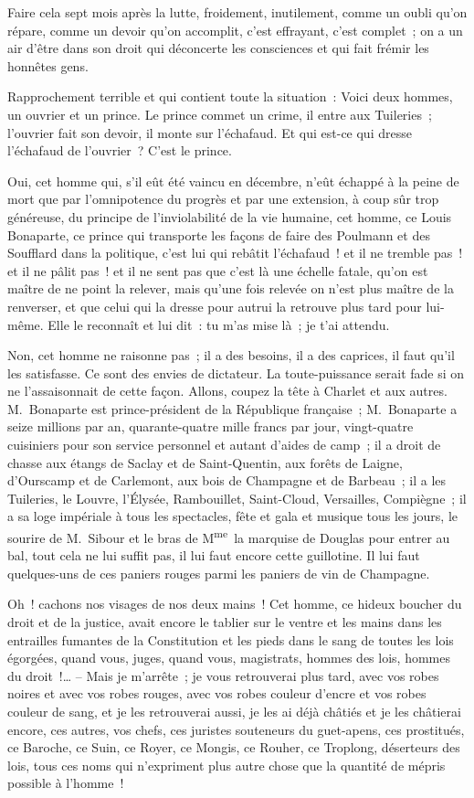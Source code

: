 \documentclass[french,twoside]{book} %
\begin{document}
Faire cela sept mois après la lutte, froidement, inutilement, comme un oubli qu’on répare, comme un devoir qu’on accomplit, c’est effrayant, c’est complet ; on a un air d’être dans son droit qui déconcerte les consciences et qui fait frémir les honnêtes gens.\par
Rapprochement terrible et qui contient toute la situation : Voici deux hommes, un ouvrier et un prince. Le prince commet un crime, il entre aux Tuileries ; l’ouvrier fait son devoir, il monte sur l’échafaud. Et qui est-ce qui dresse l’échafaud de l’ouvrier ? C’est le prince.\par
Oui, cet homme qui, s’il eût été vaincu en décembre, n’eût échappé à la peine de mort que par l’omnipotence du progrès et par une extension, à coup sûr trop généreuse, du principe de l’inviolabilité de la vie humaine, cet homme, ce Louis Bonaparte, ce prince qui transporte les façons de faire des Poulmann et des Soufflard dans la politique, c’est lui qui rebâtit l’échafaud ! et il ne tremble pas ! et il ne pâlit pas ! et il ne sent pas que c’est là une échelle fatale, qu’on est maître de ne point la relever, mais qu’une fois relevée on n’est plus maître de la renverser, et que celui qui la dresse pour autrui la retrouve plus tard pour lui-même. Elle le reconnaît et lui dit : tu m’as mise là ; je t’ai attendu.\par
Non, cet homme ne raisonne pas ; il a des besoins, il a des caprices, il faut qu’il les satisfasse. Ce sont des envies de dictateur. La toute-puissance serait fade si on ne l’assaisonnait de cette façon. Allons, coupez la tête à Charlet et aux autres. M. Bonaparte est prince-président de la République française ; M. Bonaparte a seize millions par an, quarante-quatre mille francs par jour, vingt-quatre cuisiniers pour son service personnel et autant d’aides de camp ; il a droit de chasse aux étangs de Saclay et de Saint-Quentin, aux forêts de Laigne, d’Ourscamp et de Carlemont, aux bois de Champagne et de Barbeau ; il a les Tuileries, le Louvre, l’Élysée, Rambouillet, Saint-Cloud, Versailles, Compiègne ; il a sa loge impériale à tous les spectacles, fête et gala et musique tous les jours, le sourire de M. Sibour et le bras de M\textsuperscript{me} la marquise de Douglas pour entrer au bal, tout cela ne lui suffit pas, il lui faut encore cette guillotine. Il lui faut quelques-uns de ces paniers rouges parmi les paniers de vin de Champagne.\par
Oh ! cachons nos visages de nos deux mains ! Cet homme, ce hideux boucher du droit et de la justice, avait encore le tablier sur le ventre et les mains dans les entrailles fumantes de la Constitution et les pieds dans le sang de toutes les lois égorgées, quand vous, juges, quand vous, magistrats, hommes des lois, hommes du droit !… – Mais je m’arrête ; je vous retrouverai plus tard, avec vos robes noires et avec vos robes rouges, avec vos robes couleur d’encre et vos robes couleur de sang, et je les retrouverai aussi, je les ai déjà châtiés et je les châtierai encore, ces autres, vos chefs, ces juristes souteneurs du guet-apens, ces prostitués, ce Baroche, ce Suin, ce Royer, ce Mongis, ce Rouher, ce Troplong, déserteurs des lois, tous ces noms qui n’expriment plus autre chose que la quantité de mépris possible à l’homme !\par
\end{document}
